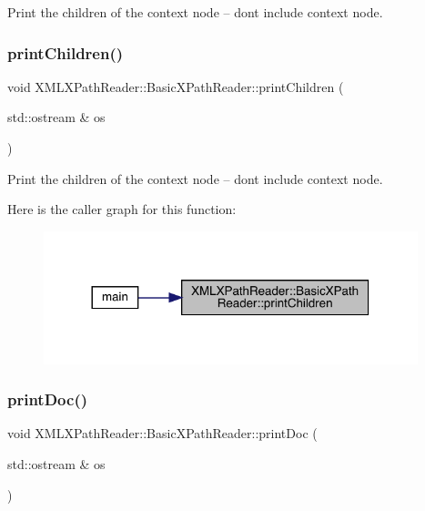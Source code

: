 Print the children of the context node -- dont include context node. 

\mbox{\label{classXMLXPathReader_1_1BasicXPathReader_a980f4e08d97855479d47e5b10205075e}} 
\subsubsection{\texorpdfstring{printChildren()}{printChildren()}\hspace{0.1cm}{\footnotesize\ttfamily [2/2]}}
{\footnotesize\ttfamily void X\+M\+L\+X\+Path\+Reader\+::\+Basic\+X\+Path\+Reader\+::print\+Children (\begin{DoxyParamCaption}\item[{std\+::ostream \&}]{os }\end{DoxyParamCaption})}



Print the children of the context node -- dont include context node. 

Here is the caller graph for this function\+:
\nopagebreak
\begin{figure}[H]
\begin{center}
\leavevmode
\includegraphics[width=308pt]{d6/dbf/classXMLXPathReader_1_1BasicXPathReader_a980f4e08d97855479d47e5b10205075e_icgraph}
\end{center}
\end{figure}
\mbox{\label{classXMLXPathReader_1_1BasicXPathReader_ab4607adfbae13b0ce3c7e5b944342207}} 
\subsubsection{\texorpdfstring{printDoc()}{printDoc()}\hspace{0.1cm}{\footnotesize\ttfamily [1/2]}}
{\footnotesize\ttfamily void X\+M\+L\+X\+Path\+Reader\+::\+Basic\+X\+Path\+Reader\+::print\+Doc (\begin{DoxyParamCaption}\item[{std\+::ostream \&}]{os }\end{DoxyParamCaption})}

